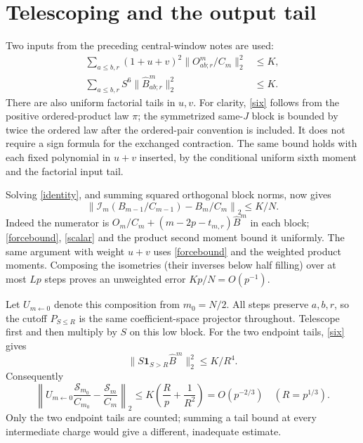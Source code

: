\documentclass[11pt,a4paper]{article}
\newcommand{\Id}{\mathcal I}
\begin{document}
\newpage
\section{Telescoping and the output tail}
Two inputs from the preceding central-window notes are used:
\begin{align}
 \sum_{a\le b,r}(1+u+v)^2\|O^m_{ab;r}/C_m\|_2^2&\le K,\label{forcebound}\\
 \sum_{a\le b,r}S^6\|\widehat B^m_{ab;r}\|_2^2&\le K.\label{six}
\end{align}
There are also uniform factorial tails in $u,v$. For clarity,
\eqref{six} follows from the positive ordered-product law $\pi$;
the symmetrized same-$J$ block is bounded by twice the ordered
law after the ordered-pair convention is included. It does not
require a sign formula for the exchanged contraction. The same
bound holds with each fixed polynomial in $u+v$ inserted, by the
conditional uniform sixth moment and the factorial input tail.

Solving \eqref{identity}, and summing squared orthogonal block norms,
now gives
\begin{equation}
 \left\|\Id_m(B_{m-1}/C_{m-1})-B_m/C_m\right\|_2\le K/N.
 \label{step}
\end{equation}
Indeed the numerator is $O_m/C_m+(m-2p-t_{m,r})\widehat B^m$
in each block; \eqref{forcebound}, \eqref{scalar} and the product
second moment bound it uniformly. The same argument with weight
$u+v$ uses \eqref{forcebound} and the weighted product moments.
Composing the isometries (their inverses below half filling) over
at most $Lp$ steps proves an unweighted error $Kp/N=O(p^{-1})$.

Let $U_{m\leftarrow0}$ denote this composition from $m_0=N/2$.
All steps preserve $a,b,r$, so the cutoff $P_{S\le R}$ is the same
coefficient-space projector throughout. Telescope first and then
multiply by $S$ on this low block. For the two endpoint tails,
\eqref{six} gives
\begin{equation}
 \|S\mathbf1_{S>R}\widehat B^m\|_2^2\le K/R^4.
\end{equation}
Consequently
\begin{equation}
 \left\|U_{m\leftarrow0}\frac{\mathcal S_{m_0}}{C_{m_0}}
                   -\frac{\mathcal S_m}{C_m}\right\|_2
 \le K\left(\frac R p+\frac1{R^2}\right)
 =O(p^{-2/3})\quad(R=p^{1/3}).\label{transport}
\end{equation}
Only the two endpoint tails are counted; summing a tail bound at
every intermediate charge would give a different, inadequate estimate.
\end{document}
